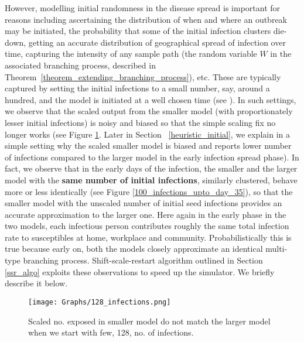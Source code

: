 \documentclass{article}
\theoremstyle{definition}
\begin{document}
However, modelling initial randomness in the disease spread is important for reasons including ascertaining the distribution of when and where an outbreak may be initiated, the probability  that some of the initial infection clusters die-down, getting an accurate  distribution of geographical spread of infection over time, 
capturing the  intensity of any sample path (the random variable $W$ in the associated branching process, described in Theorem~\ref{theorem_extending_branching_process}), etc.
These are typically captured by setting the initial infections to a small number, say, around a hundred, and the model is initiated at a well chosen time (see \cite{City_Simulator_IISc_TIFR_2020}). 
In such settings,  we observe that the scaled output from the smaller model 
(with proportionately lesser initial infections) is noisy and biased so that the simple scaling fix no longer works (see Figure \ref{128_infections}. Later 
in Section ~\ref{heuristic_initial}, we explain in a simple setting why the scaled smaller model is biased and reports lower number of infections compared to the larger model in the 
early infection spread phase).
 In fact, we observe that in the early days of the infection, the smaller and the larger model with the \textbf{same number of initial infections}, 
 similarly clustered, behave more or less identically (see Figure \ref{100_infections_upto_day_35}), so that the smaller model  with the unscaled number of initial seed infections 
provides an accurate approximation to the larger one. Here again in the early phase in the two models, each infectious person contributes roughly the same total infection  rate to susceptibles 
at home, workplace and community.  
Probabilistically this is true because early on, both the models closely approximate an identical multi-type branching process. Shift-scale-restart algorithm outlined in Section \ref{ssr_algo} exploits these observations to speed up the simulator. We briefly describe it below.

\begin{figure}
      \centering
      
 \texttt{[image: Graphs/128\_infections.png]}   
    \caption{Scaled no. exposed in smaller model do not match the larger model when we start with few, 128, no. of infections. }
    \label{128_infections}
  \end{figure}
\end{document}
